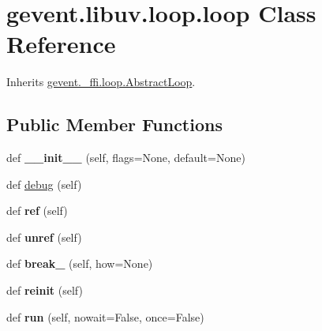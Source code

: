 \hypertarget{classgevent_1_1libuv_1_1loop_1_1loop}{}\section{gevent.\+libuv.\+loop.\+loop Class Reference}
\label{classgevent_1_1libuv_1_1loop_1_1loop}


Inherits \hyperlink{classgevent_1_1__ffi_1_1loop_1_1_abstract_loop}{gevent.\+\_\+ffi.\+loop.\+Abstract\+Loop}.

\subsection*{Public Member Functions}
\begin{DoxyCompactItemize}
\item 
\mbox{\label{classgevent_1_1libuv_1_1loop_1_1loop_afa85bdd5ea2805056ca0fc8047945c59}} 
def {\bfseries \+\_\+\+\_\+init\+\_\+\+\_\+} (self, flags=None, default=None)
\item 
def \hyperlink{classgevent_1_1libuv_1_1loop_1_1loop_a5c0c36a1ee75a6b1dca7006963696a83}{debug} (self)
\item 
\mbox{\label{classgevent_1_1libuv_1_1loop_1_1loop_a985b5360d6d7a73bbd32337cfe16b0b5}} 
def {\bfseries ref} (self)
\item 
\mbox{\label{classgevent_1_1libuv_1_1loop_1_1loop_a718418b95f375bd8068ada528da0b468}} 
def {\bfseries unref} (self)
\item 
\mbox{\label{classgevent_1_1libuv_1_1loop_1_1loop_a7854207fed8335a12fb702d21793a7d5}} 
def {\bfseries break\+\_\+} (self, how=None)
\item 
\mbox{\label{classgevent_1_1libuv_1_1loop_1_1loop_a3868d5d4f1c888a63a6578b6e224621f}} 
def {\bfseries reinit} (self)
\item 
\mbox{\label{classgevent_1_1libuv_1_1loop_1_1loop_a6543bd38e78b0534aa4f81b967f73cbc}} 
def {\bfseries run} (self, nowait=False, once=False)
\item 

\end{DoxyCompactItemize}
